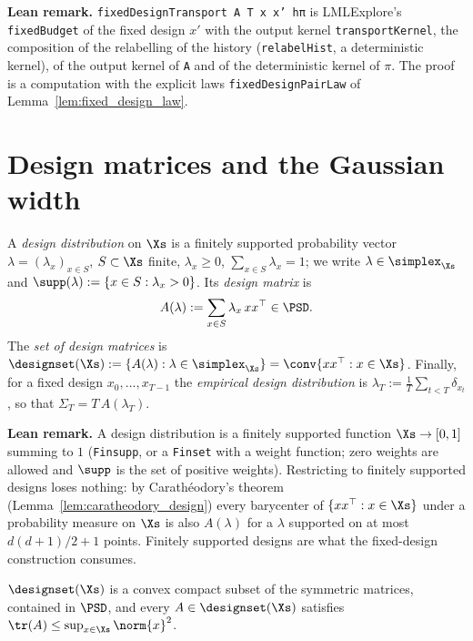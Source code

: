\textbf{Lean remark.} \texttt{fixedDesignTransport A T x x' hπ} is
LMLExplore's \texttt{fixedBudget} of the fixed design $x'$ with the output kernel
\texttt{transportKernel}, the composition of the relabelling of the history
(\texttt{relabelHist}, a deterministic kernel), of the output kernel of \texttt{A} and of the
deterministic kernel of $\pi$. The proof is a computation with the explicit laws
\texttt{fixedDesignPairLaw} of Lemma~\ref{lem:fixed_design_law}.

\section{Design matrices and the Gaussian width}
\label{sec:model_width}

\begin{definition}\label{def:design_matrix}
\leanok
{}
A \emph{design distribution} on $\Xs$ is a finitely supported probability vector
$\lambda = (\lambda_x)_{x \in S}$, $S \subset \Xs$ finite, $\lambda_x \ge 0$,
$\sum_{x \in S} \lambda_x = 1$; we write $\lambda \in \simplex_{\Xs}$ and
$\supp(\lambda) := \{x \in S : \lambda_x > 0\}$. Its \emph{design matrix} is
\[
  A(\lambda) := \sum_{x \in S} \lambda_x\, x x^\top \in \PSD .
\]
The \emph{set of design matrices} is $\designset(\Xs) := \{A(\lambda) : \lambda \in
\simplex_{\Xs}\} = \conv\{x x^\top : x \in \Xs\}$. Finally, for a fixed design
$x_0,\dots,x_{T-1}$ the \emph{empirical design distribution} is
$\lambda_T := \frac1T \sum_{t<T} \delta_{x_t}$, so that $\Sigma_T = T\, A(\lambda_T)$.
\end{definition}

\textbf{Lean remark.} A design distribution is a finitely supported function
$\Xs \to [0,1]$ summing to $1$ (\texttt{Finsupp}, or a \texttt{Finset} with a weight function;
zero weights are allowed and $\supp$ is the set of positive weights). Restricting to finitely
supported designs loses nothing: by
Carathéodory's theorem (Lemma~\ref{lem:caratheodory_design}) every barycenter of
$\{xx^\top : x \in \Xs\}$ under a probability measure on $\Xs$ is also $A(\lambda)$ for a
$\lambda$ supported on at most $d(d+1)/2 + 1$ points. Finitely supported designs are what
the fixed-design construction consumes.

\begin{lemma}\label{lem:designset_basic}
\leanok
{}
$\designset(\Xs)$ is a convex compact subset of the symmetric matrices, contained in $\PSD$,
and every $A \in \designset(\Xs)$ satisfies $\tr(A) \le \sup_{x\in\Xs}\norm{x}^2$.
\end{lemma}

